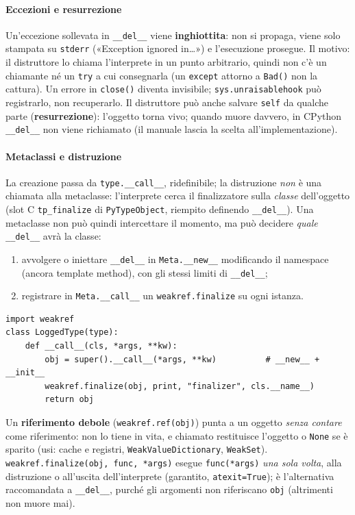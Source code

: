 \documentclass[a4paper,12pt]{article}
\begin{document}
\paragraph{Eccezioni e resurrezione} Un'eccezione sollevata in \texttt{\_\_del\_\_} viene
\textbf{inghiottita}: non si propaga, viene solo stampata su \texttt{stderr} («Exception ignored
in\dots») e l'esecuzione prosegue. Il motivo: il distruttore lo chiama l'interprete in un punto
arbitrario, quindi non c'è un chiamante né un \texttt{try} a cui consegnarla (un \texttt{except}
attorno a \texttt{Bad()} non la cattura). Un errore in \texttt{close()} diventa invisibile;
\texttt{sys.unraisablehook} può registrarlo, non recuperarlo. Il distruttore può anche salvare
\texttt{self} da qualche parte (\textbf{resurrezione}): l'oggetto torna vivo; quando muore
davvero, in CPython \texttt{\_\_del\_\_} non viene richiamato (il manuale lascia la scelta
all'implementazione).

\paragraph{Metaclassi e distruzione} La creazione passa da \texttt{type.\_\_call\_\_},
ridefinibile; la distruzione \emph{non} è una chiamata alla metaclasse: l'interprete cerca il
finalizzatore sulla \emph{classe} dell'oggetto (slot C \texttt{tp\_finalize} di
\texttt{PyTypeObject}, riempito definendo \texttt{\_\_del\_\_}). Una metaclasse non può quindi
intercettare il momento, ma può decidere \emph{quale} \texttt{\_\_del\_\_} avrà la classe:
\begin{enumerate}[nosep]
  \item avvolgere o iniettare \texttt{\_\_del\_\_} in \texttt{Meta.\_\_new\_\_} modificando il
        namespace (ancora template method), con gli stessi limiti di \texttt{\_\_del\_\_};
  \item registrare in \texttt{Meta.\_\_call\_\_} un \texttt{weakref.finalize} su ogni istanza.
\end{enumerate}
\begin{verbatim}
import weakref
class LoggedType(type):
    def __call__(cls, *args, **kw):
        obj = super().__call__(*args, **kw)          # __new__ + __init__
        weakref.finalize(obj, print, "finalizer", cls.__name__)
        return obj
\end{verbatim}
Un \textbf{riferimento debole} (\texttt{weakref.ref(obj)}) punta a un oggetto \emph{senza contare}
come riferimento: non lo tiene in vita, e chiamato restituisce l'oggetto o \texttt{None} se è
sparito (usi: cache e registri, \texttt{WeakValueDictionary}, \texttt{WeakSet}).
\texttt{weakref.finalize(obj, func, *args)} esegue \texttt{func(*args)} \emph{una sola volta},
alla distruzione o all'uscita dell'interprete (garantito, \texttt{atexit=True}); è l'alternativa
raccomandata a \texttt{\_\_del\_\_}, purché gli argomenti non riferiscano \texttt{obj}
(altrimenti non muore mai).
\end{document}
